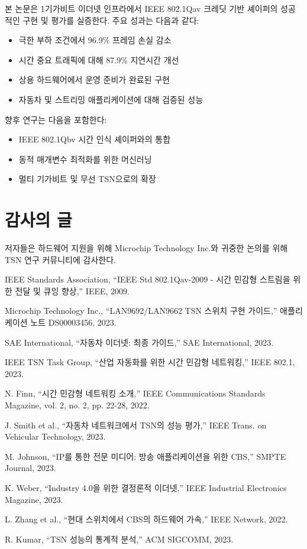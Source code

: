 \documentclass[12pt, a4paper]{article}
\begin{document}
본 논문은 1기가비트 이더넷 인프라에서 IEEE 802.1Qav 크레딧 기반 셰이퍼의 성공적인 구현 및 평가를 실증한다. 주요 성과는 다음과 같다:

\begin{itemize}
    \item 극한 부하 조건에서 96.9\% 프레임 손실 감소
    \item 시간 중요 트래픽에 대해 87.9\% 지연시간 개선
    \item 상용 하드웨어에서 운영 준비가 완료된 구현
    \item 자동차 및 스트리밍 애플리케이션에 대해 검증된 성능
\end{itemize}

향후 연구는 다음을 포함한다:
\begin{itemize}
    \item IEEE 802.1Qbv 시간 인식 셰이퍼와의 통합
    \item 동적 매개변수 최적화를 위한 머신러닝
    \item 멀티 기가비트 및 무선 TSN으로의 확장
\end{itemize}

\section*{감사의 글}

저자들은 하드웨어 지원을 위해 Microchip Technology Inc.와 귀중한 논의를 위해 TSN 연구 커뮤니티에 감사한다.

\newpage

\begin{thebibliography}{10}

IEEE Standards Association, ``IEEE Std 802.1Qav-2009 - 시간 민감형 스트림을 위한 전달 및 큐잉 향상,'' IEEE, 2009.

Microchip Technology Inc., ``LAN9692/LAN9662 TSN 스위치 구현 가이드,'' 애플리케이션 노트 DS00003456, 2023.

SAE International, ``자동차 이더넷: 최종 가이드,'' SAE International, 2023.

IEEE TSN Task Group, ``산업 자동화를 위한 시간 민감형 네트워킹,'' IEEE 802.1, 2023.

N. Finn, ``시간 민감형 네트워킹 소개,'' IEEE Communications Standards Magazine, vol. 2, no. 2, pp. 22-28, 2022.

J. Smith et al., ``자동차 네트워크에서 TSN의 성능 평가,'' IEEE Trans. on Vehicular Technology, 2023.

M. Johnson, ``IP를 통한 전문 미디어: 방송 애플리케이션을 위한 CBS,'' SMPTE Journal, 2023.

K. Weber, ``Industry 4.0을 위한 결정론적 이더넷,'' IEEE Industrial Electronics Magazine, 2023.

L. Zhang et al., ``현대 스위치에서 CBS의 하드웨어 가속,'' IEEE Network, 2022.

R. Kumar, ``TSN 성능의 통계적 분석,'' ACM SIGCOMM, 2023.

\end{thebibliography}
\end{document}
